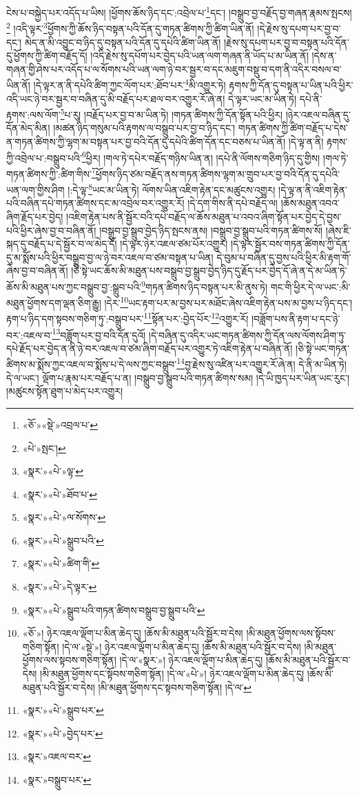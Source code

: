 ངེས་པ་བསྐྱེད་པར་འདོད་པ་ཡིས། །ཕྱོགས་ཆོས་ཉིད་དང་:འབྲེལ་པ་\footnote{«ཅོ་»«སྡེ་»འབྲལ་པ་}དང་། །བསྒྲུབ་བྱ་བརྗོད་བྱ་གཞན་རྣམས་སྤངས།\footnote{«པེ་»སྤང་།} །འདི་ལྟར་\footnote{«སྣར་»«པེ་»ལྟ་}ཕྱོགས་ཀྱི་ཆོས་ཉིད་བསྟན་པའི་དོན་དུ་གཏན་ཚིགས་ཀྱི་ཚིག་ཡིན་ནོ། །དེ་རྗེས་སུ་དཔག་པར་བྱ་བ་དང་། མེད་ན་མི་འབྱུང་བ་ཉིད་དུ་བསྟན་པའི་དོན་དུ་དཔེའི་ཚིག་ཡིན་ནོ། །རྗེས་སུ་དཔག་པར་བྱ་བ་བསྟན་པའི་དོན་དུ་ཕྱོགས་ཀྱི་ཚིག་བརྗོད་དོ། །འདི་རྗེས་སུ་དཔོག་པར་བྱེད་པའི་ཡན་ལག་གཞན་ནི་ཡོད་པ་མ་ཡིན་ནོ། །དེས་ན་གཞན་གྱི་ཤེས་པར་འདོད་པ་ལ་སོགས་པའི་ཡན་ལག་ཉེ་བར་སྦྱར་བ་དང་མཇུག་བསྡུ་བ་དག་ནི་འདིར་བསལ་བ་ཡིན་ནོ། །དེ་ལྟར་ན་ནི་དཔེའི་ཚིག་ཀྱང་ལོག་པར་:ཐོབ་པར་\footnote{«སྣར་»«པེ་»ཐོབ་པ་}མི་འགྱུར་ཏེ། རྟགས་ཀྱི་དོན་དུ་བསྟན་པ་ཡིན་པའི་ཕྱིར་འདི་ཡང་ཉེ་བར་སྦྱར་བ་བཞིན་དུ་མི་བརྗོད་པར་ཐལ་བར་འགྱུར་རོ་ཞེ་ན། དེ་ལྟར་ཡང་མ་ཡིན་ཏེ། དཔེ་ནི་རྟགས་:ལས་ལོག་\footnote{«སྣར་»«པེ་»ལ་སོགས་}པ་རུ། །བརྗོད་པར་བྱ་བ་མ་ཡིན་ཏེ། །གཏན་ཚིགས་ཀྱི་དོན་སྟོན་པའི་ཕྱིར། །ཉེར་འཇལ་བཞིན་དུ་དོན་མེད་མིན། །མཚན་ཉིད་གསུམ་པའི་རྟགས་ལ་བསྒྲུབ་པར་བྱ་བ་ཉིད་དང་། གཏན་ཚིགས་ཀྱི་ཚིག་བརྗོད་པ་དེས་ན་གཏན་ཚིགས་ཀྱི་ལྷག་མ་བསྟན་པར་བྱ་བའི་དོན་དུ་དཔེའི་ཚིག་དོན་དང་བཅས་པ་ཡིན་ནོ། །དེ་ལྟ་ན་ནི། རྟགས་ཀྱི་འབྲེལ་པ་:བསྒྲུབ་པའི་\footnote{«སྣར་»«པེ་»སྒྲུབ་པའི་}ཕྱིར། །གལ་ཏེ་དཔེར་བརྗོད་གཉིས་ཡིན་ན། །དཔེ་ནི་ལོགས་གཅིག་ཉིད་དུ་གྱིས། །གལ་ཏེ་གཏན་ཚིགས་ཀྱི་:ཚིག་གིས་\footnote{«སྣར་»«པེ་»ཚིག་གི་}ཕྱོགས་ཉིད་ཙམ་བརྗོད་ནས་གཏན་ཚིགས་ལྷག་མ་གྲུབ་པར་བྱ་བའི་དོན་དུ་དཔེའི་ཡན་ལག་གྱིས་ཤིག །:དེ་ལྟ་\footnote{«སྣར་»«པེ་»དེ་ལྟར་}ཡང་མ་ཡིན་ཏེ། ལོགས་ཡིན་འཇིག་རྟེན་དང་མཚུངས་འགྱུར། །དེ་ལྟ་ན་ནི་འཇིག་རྟེན་པའི་བཞིན་དཔེ་གཏན་ཚིགས་དང་མ་འབྲེལ་བར་འགྱུར་རོ། །དེ་དག་གིས་ནི་དཔེ་བརྗོད་ལ། །ཆོས་མཐུན་འབའ་ཞིག་རྗོད་པར་བྱེད། །འཇིག་རྟེན་པས་ནི་སྦྱོར་བའི་དཔེ་བརྗོད་ལ་ཆོས་མཐུན་པ་འབའ་ཞིག་སྟོན་པར་བྱེད་དེ་བྱས་པའི་ཕྱིར་ཞེས་བྱ་བ་བཞིན་ནོ། །བསྒྲུབ་བྱ་སྒྲུབ་བྱེད་ཉིད་སྤངས་ནས། །བསྒྲུབ་བྱ་སྒྲུབ་པའི་གཏན་ཚིགས་སོ། །ཞེས་ཇི་སྐད་དུ་བརྗོད་པ་དེ་སྦྱོར་བ་ལ་མེད་དོ། །དེ་ལྟར་ཉེར་འཇལ་ཙམ་པོར་འགྱུར། །དེ་ལྟར་སྦྱོར་བས་གཏན་ཚིགས་ཀྱི་དོན་དུ་མ་སྨོས་པའི་ཕྱིར་བསྒྲུབ་བྱ་ལ་ཉེ་བར་འཇལ་བ་ཙམ་བསྟན་པ་ཡིན། དེ་བུམ་པ་བཞིན་དུ་བྱས་པའི་ཕྱིར་མི་རྟག་གོ་ཞེས་བྱ་བ་བཞིན་ནོ། །ཅི་སྟེ་ཡང་ཆོས་མི་མཐུན་པས་བསྒྲུབ་བྱ་སྒྲུབ་བྱེད་ཉིད་དུ་རྗོད་པར་བྱེད་དོ་ཞེ་ན་དེ་མ་ཡིན་ཏེ་ཆོས་མི་མཐུན་པས་ཀྱང་བསྒྲུབ་བྱ་:སྒྲུབ་པའི་\footnote{«སྣར་»«པེ་»སྒྲུབ་པའི་གཏན་ཚིགས་བསྒྲུབ་བྱ་སྒྲུབ་པའི་}གཏན་ཚིགས་ཉིད་བསྟན་པར་མི་ནུས་ཏེ། གང་གི་ཕྱིར་དེ་ལ་ཡང་:མི་མཐུན་ཕྱོགས་དག་ལྡན་ཅིག་རྒྱུ། །དེར་\footnote{«ཅོ་»། ཉེར་འཇལ་ལྡོག་པ་མིན་ཆེད་དུ། །ཆོས་མི་མཐུན་པའི་སྦྱོར་བ་དེས། །མི་མཐུན་ཕྱོགས་ལས་སྟོབས་གཅིག་སྟོན། །དེ་ལ་«སྡེ་»། ཉེར་འཇལ་ལྡོག་པ་མིན་ཆེད་དུ། །ཆོས་མི་མཐུན་པའི་སྦྱོར་བ་དེས། །མི་མཐུན་ཕྱོགས་ལས་སྟབས་གཅིག་སྟོན། །དེ་ལ་«སྣར་»། ཉེར་འཇལ་ལྡོག་པ་མིན་ཆེད་དུ། །ཆོས་མི་མཐུན་པའི་སྦྱོར་བ་དེས། །མི་མཐུན་ཕྱོགས་དང་སྟོབས་གཅིག་སྟོན། །དེ་ལ་«པེ་»། ཉེར་འཇལ་ལྡོག་པ་མིན་ཆེད་དུ། །ཆོས་མི་མཐུན་པའི་སྦྱོར་བ་དེས། །མི་མཐུན་ཕྱོགས་དང་སྟབས་གཅིག་སྟོན། །དེ་ལ་}ཡང་རྟག་པར་མ་བྱས་པར་མཐོང་ཞེས་འཇིག་རྟེན་པས་མ་བྱས་པ་ཉིད་དང་། རྟག་པ་ཉིད་དག་སྟབས་གཅིག་ཏུ་:བསྒྲུབ་པར་\footnote{«སྣར་»«པེ་»སྒྲུབ་པར་}སྟོན་པར་:བྱེད་པོར་\footnote{«སྣར་»«པེ་»བྱེད་པར་}འགྱུར་རོ། །བཟློག་པས་ནི་རྟག་པ་དང་ཉེ་བར་:འཇལ་བ་\footnote{«སྣར་»འཇལ་བར་}བཟློག་པར་བྱ་བའི་དོན་དུའོ། །དེ་བཞིན་དུ་འདིར་ཡང་གཏན་ཚིགས་ཀྱི་དོན་ལས་ལོགས་ཤིག་ཏུ་དཔེ་རྗོད་པར་བྱེད་ན་ནི་ཉེ་བར་འཇལ་བ་ཙམ་ཞིག་བརྗོད་པར་འགྱུར་ཏེ་འཇིག་རྟེན་པ་བཞིན་ནོ། །ཅི་སྟེ་ཡང་གཏན་ཚིགས་མ་སྨོས་ཀྱང་འཇལ་བ་སྨོས་པ་དེ་ལས་ཀྱང་བསྒྲུབ་\footnote{«སྣར་»བསྒྲུབ་པར་}བྱ་རྗེས་སུ་འཛིན་པར་འགྱུར་རོ་ཞེ་ན། དེ་ནི་མ་ཡིན་ཏེ། དེ་ལ་ཡང་། ལྡོག་པ་རྣམ་པར་བརྗོད་པ་ན། །བསྒྲུབ་བྱ་སྒྲུབ་པའི་གཏན་ཚིགས་སམ། །དེ་ཡི་ཁྱད་པར་ཡིན་ཡང་རུང་། །མཚུངས་སྟོན་ཐུག་པ་མེད་པར་འགྱུར། 